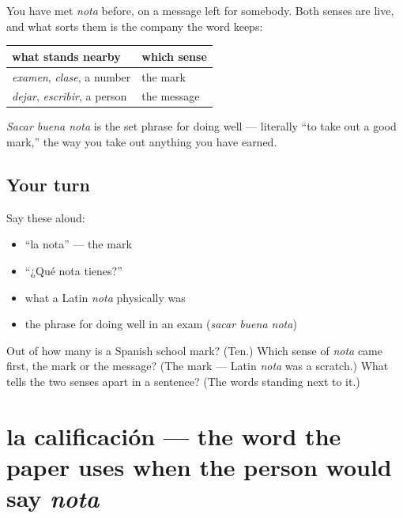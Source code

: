 \begin{grammarlens}[title={Grammar Lens: one word, two senses, and how to tell them apart}]
You have met \emph{nota} before, on a message left for somebody. Both senses are live, and what sorts them is the company the word keeps:

\noindent
\begin{tabularx}{\linewidth}{@{}>{\raggedright\arraybackslash}X>{\raggedright\arraybackslash}X@{}}
\toprule
\textbf{what stands nearby} & \textbf{which sense} \\
\midrule
\emph{examen}, \emph{clase}, a number & the mark \\
\emph{dejar}, \emph{escribir}, a person & the message \\
\bottomrule
\end{tabularx}

\emph{Sacar buena nota} is the set phrase for doing well — literally \textquotedblleft{}to take out a good mark,\textquotedblright{} the way you take out anything you have earned.
\end{grammarlens}

\subsection*{Your turn}
Say these aloud:

\begin{itemize}
\raggedright
  \item \textquotedblleft{}la nota\textquotedblright{} — the mark
  \item \textquotedblleft{}¿Qué nota tienes?\textquotedblright{}
  \item what a Latin \emph{nota} physically was
  \item the phrase for doing well in an exam (\emph{sacar buena nota})
\end{itemize}

\begin{tcolorbox}[breakable,colback=teal!4,colframe=teal!35!black,title={Before you move on}]
Out of how many is a Spanish school mark? (Ten.) Which sense of \emph{nota} came first, the mark or the message? (The mark — Latin \emph{nota} was a scratch.) What tells the two senses apart in a sentence? (The words standing next to it.)
\end{tcolorbox}
\section[la calificación]{la calificación — the word the paper uses when the person would say \emph{nota}}

